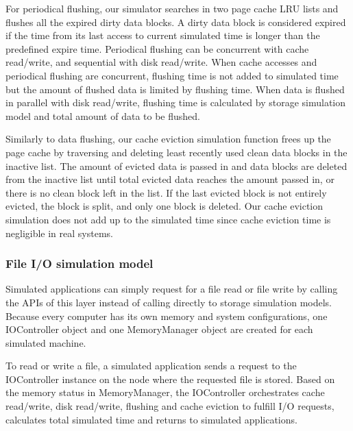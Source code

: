\documentclass[conference]{IEEEtran}
\begin{document}
			For periodical flushing, our simulator searches in two page cache 
			LRU lists and flushes all the expired dirty data blocks. 
			A dirty data block is considered expired if the time from its last access 
			to current simulated time is longer than the predefined expire time. 
			Periodical flushing can be concurrent with cache read/write, 
			and sequential with disk read/write. When cache accesses and 
			periodical flushing are concurrent, flushing time is not added to simulated 
			time but the amount of flushed data is limited by flushing time. 
			When data is flushed in parallel with disk read/write, flushing time is 
			calculated by storage simulation model and total amount of data 
			to be flushed.
				
			Similarly to data flushing, our cache eviction simulation function frees up 
			the page cache by traversing and deleting least recently used clean 
			data blocks in the inactive list.
			The amount of evicted data is passed in and data blocks are deleted 
			from the inactive list until total evicted data reaches the amount 
			passed in, or there is no clean block left in the list.
			If the last evicted block is not entirely evicted, the block is split, 
			and only one block is deleted.
			Our cache eviction simulation does not add up to the simulated time 
			since cache eviction time is negligible in real systems.			
			
			\subsubsection{File I/O simulation model}			
			
			Simulated applications can simply request for a file read 
			or file write by calling the APIs of this layer instead of 
			calling directly to storage simulation models.
			Because every computer has its own memory and system configurations, 
			one IOController object and one MemoryManager object are created 
			for each simulated machine.
			
			To read or write a file, a simulated application sends a request to the 
			IOController instance on the node where the requested file is stored.
			Based on the memory status in MemoryManager, the IOController 
			orchestrates cache read/write, disk read/write, flushing and cache eviction 
			to fulfill I/O requests, calculates total simulated time and returns to 
			simulated applications.
			
\end{document}
